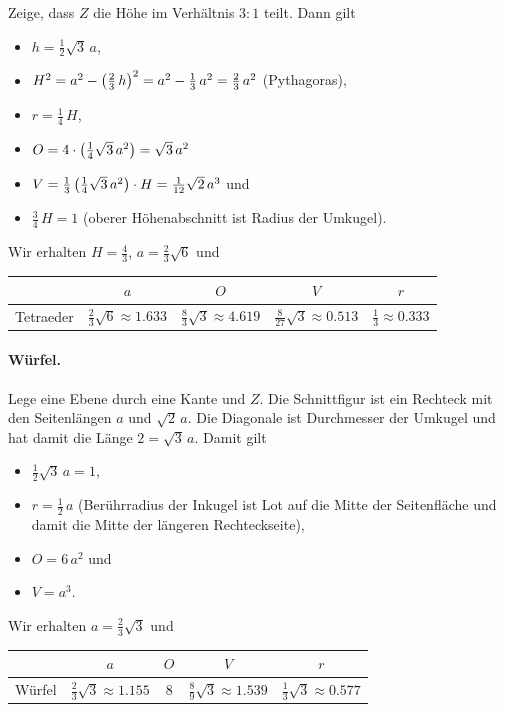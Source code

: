 \documentclass[11pt]{article}
\begin{document}
Zeige, dass $Z$ die Höhe im Verhältnis $3:1$ teilt.  Dann gilt
\begin{itemize}
\item $h=\frac12\sqrt{3}\,a$,
\item $H^2=a^2-\left(\frac23\,h\right)^2=a^2-\frac13\,a^2=\frac23\,a^2$ (Pythagoras), 
\item $r=\frac14\,H$,
\item $O=4\cdot \left(\frac14\sqrt{3}\,a^2\right)=\sqrt{3}\,a^2$ 
\item $V=\frac13 \left(\frac14\sqrt{3}\,a^2\right)\cdot H = \frac{1}{12}\sqrt{2}\,a^3$
  und
\item $\frac34\,H=1$ (oberer Höhenabschnitt ist Radius der Umkugel).
\end{itemize}
Wir erhalten $H=\frac43$, $a=\frac23\sqrt{6}$ und
\begin{center}
  \begin{tabular}{|l|c|c|c|c|}\hline
    & $a$ & $O$ & $V$ & $r$ \\\hline
    Tetraeder & $\frac23\sqrt{6}\approx 1.633$ & $\frac83\sqrt{3} \approx
    4.619$ & $\frac{8}{27}\sqrt{3} \approx 0.513$ & $\frac13 \approx 0.333$
    \\\hline  
  \end{tabular}
\end{center}

\paragraph{Würfel.}
Lege eine Ebene durch eine Kante und $Z$. Die Schnittfigur ist ein
Rechteck mit den Seitenlängen $a$ und $\sqrt{2}\,a$.  Die Diagonale ist
Durchmesser der Umkugel und hat damit die Länge $2=\sqrt{3}\,a$. Damit gilt
\begin{itemize}
\item $\frac12\sqrt{3}\,a=1$,
\item $r=\frac12\,a$ (Berührradius der Inkugel ist Lot auf die Mitte der
  Seitenfläche und damit die Mitte der längeren Rechteckseite),
\item $O=6\,a^2$ und 
\item $V=a^3$.
\end{itemize}
Wir erhalten $a=\frac23\sqrt{3}$ und
\begin{center}
  \begin{tabular}{|l|c|c|c|c|}\hline
    & $a$ & $O$ & $V$ & $r$ \\\hline
    Würfel & $\frac23\sqrt{3}\approx 1.155$ & $8$ & $\frac{8}{9}\sqrt{3}
    \approx 1.539$ & $\frac13\sqrt{3} \approx 0.577$ \\\hline  
  \end{tabular}
\end{center}
\end{document}
